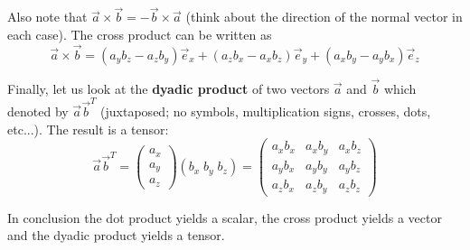 Also note that $\vec{a} \times \vec{b} = - \vec{b} \times \vec{a}$ (think about the direction of the 
normal vector in each case). The cross product can be written as
\[
\vec{a} \times \vec{b} = (a_yb_z-a_zb_y) \vec{e}_x + (a_zb_x-a_xb_z) \vec{e}_y + (a_xb_y-a_yb_x) \vec{e}_z  
\]

Finally, let us look at the {\bf dyadic product} of two vectors $\vec{a}$ and $\vec{b}$ which denoted by
$\vec{a}\vec{b}^T$ (juxtaposed; no symbols, multiplication signs, crosses, dots, etc...). The 
result is a tensor:
\[
\vec{a}\vec{b}^T 
=
\left(
\begin{array}{c}
a_x \\ a_y \\ a_z
\end{array}
\right)
(b_x \; b_y \; b_z)
=
\left(
\begin{array}{ccc}
a_x b_x & a_xb_y & a_xb_z \\
a_y b_x & a_yb_y & a_yb_z \\
a_z b_x & a_zb_y & a_zb_z 
\end{array}
\right)
\]

In conclusion the dot product yields a scalar, the cross product yields a vector and the dyadic 
product yields a tensor. 






